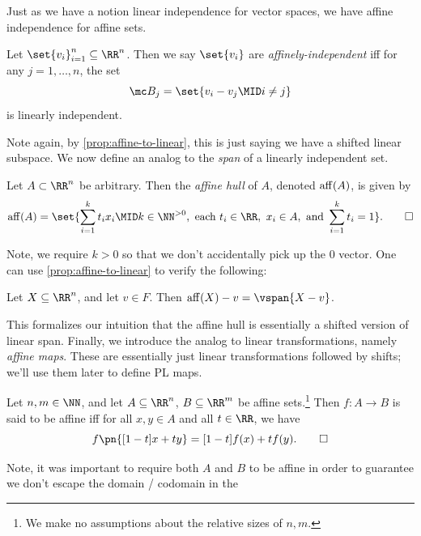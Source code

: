 Just as we have a notion linear independence for vector spaces, we
have affine independence for affine sets.
\begin{definition}
  Let $\set{v_i}_{i=1}^n \subseteq \RR^n$. Then we say $\set{v_i}$
  are \emph{affinely-independent} iff %
  for any $j = 1, \ldots, n$, the set
  \[
    \mc B_j = \set{v_i - v_j \MID %
      i \neq j}
  \]
  is linearly independent.
\end{definition}
Note again, by \cref{prop:affine-to-linear}, this is just saying we
have a shifted linear subspace. We now define an analog to the
\emph{span} of a linearly independent set.
\begin{definition}
  Let $A \subset \RR^n$ be arbitrary. Then the \emph{affine hull} of
  $A$, denoted $\operatorname{aff}(A)$, is given by
  \[
    \aff(A) = \set{\sum_{i=1}^k t_i x_i \MID k \in \NN^{> 0},\
      \text{each}\ t_i \in \RR,\ x_i \in A, \text{ and } \sum_{i=1}^k
      t_i = 1%
    }. \qedhere
  \]
\end{definition}
Note, we require $k > 0$ so that we don't accidentally pick up the
$0$ vector. One can use \cref{prop:affine-to-linear} to verify the
following:
\begin{proposition}
  Let $X \subseteq \RR^n$, and let $v \in F$. Then $\aff(X) - v =
  \vspan{X-v}$.
\end{proposition}
This formalizes our intuition that the affine hull is essentially a
shifted version of linear span. Finally, we introduce the analog to
linear transformations, namely \emph{affine maps}. These are
essentially just linear transformations followed by shifts; we'll use
them later to define PL maps.
\begin{definition}
  Let $n,m \in \NN$, and let $A \subseteq\RR^n$, $B \subseteq \RR^m$
  be affine sets.\footnote{We make no assumptions about the relative
    sizes of $n,m$.} Then $f : A \to B$ is said to be affine iff for
  all $x,y \in A$ and all $t \in \RR$, we have
  \[
    f\pn{[1-t]x + ty} = [1-t] f(x) + tf(y). \qedhere
  \]
\end{definition}
Note, it was important to require both $A$ and $B$ to be affine in
order to guarantee we don't escape the domain / codomain in the
